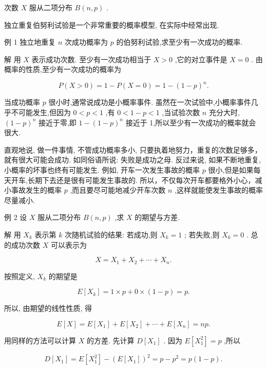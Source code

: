 \documentclass[10pt]{article}
\begin{document}
次数 \(X\) 服从二项分布 \(B\left( {n,p}\right)\) .

独立重复伯努利试验是一个非常重要的概率模型, 在实际中经常出现.

例 1 独立地重复 \(n\) 次成功概率为 \(p\) 的伯努利试验,求至少有一次成功的概率.

解 用 \(X\) 表示成功次数. 至少有一次成功相当于 \(X > 0\) ,它的对立事件是 \(X = 0\) . 由概率的性质,至少有一次成功的概率为

\[
P\left( {X > 0}\right)  = 1 - P\left( {X = 0}\right)  = 1 - {\left( 1 - p\right) }^{n}.
\]

当成功概率 \(p\) 很小时,通常说成功是小概率事件. 虽然在一次试验中,小概率事件几乎不可能发生,但因为 \(0 < p < 1\) ,有 \(0 < 1 - p < 1\) ,当试验次数 \(n\) 充分大时, \({\left( 1 - p\right) }^{n}\) 接近于零,即 \(1 - {\left( 1 - p\right) }^{n}\) 接近于 1,所以至少有一次成功的概率就会很大.

直观地说, 做一件事情, 不管成功概率多小, 只要执着地努力，重复的次数足够多，就有很大可能会成功. 如同俗语所说: 失败是成功之母. 反过来说, 如果不断地重复, 小概率的坏事也终有可能发生. 例如, 开车一次发生事故的概率 \(p\) 很小,但是如果每天开车,长期下去还是很有可能发生事故的. 所以，不仅每次开车都要格外小心，减小事故发生的概率 \(p\) ,而且要尽可能地减少开车次数 \(n\) ,这样就能使发生事故的概率尽量减小.

例 2 设 \(X\) 服从二项分布 \(B\left( {n,p}\right)\) ,求 \(X\) 的期望与方差.

解 用 \({X}_{k}\) 表示第 \(k\) 次随机试验的结果: 若成功,则 \({X}_{k} = 1\) ; 若失败,则 \({X}_{k} = 0\) . 总的成功次数 \(X\) 可以表示为

\[
X = {X}_{1} + {X}_{2} + \cdots  + {X}_{n}.
\]

按照定义, \({X}_{k}\) 的期望是

\[
E\left\lbrack  {X}_{k}\right\rbrack   = 1 \times  p + 0 \times  \left( {1 - p}\right)  = p.
\]

所以, 由期望的线性性质, 得

\[
E\left\lbrack  X\right\rbrack   = E\left\lbrack  {X}_{1}\right\rbrack   + E\left\lbrack  {X}_{2}\right\rbrack   + \cdots  + E\left\lbrack  {X}_{n}\right\rbrack   = {np}.
\]

用同样的方法可以计算 \(X\) 的方差. 先计算 \(D\left\lbrack  {X}_{1}\right\rbrack\) . 因为 \(E\left\lbrack  {X}_{1}^{2}\right\rbrack   = p\) ,所以

\[
D\left\lbrack  {X}_{1}\right\rbrack   = E\left\lbrack  {X}_{1}^{2}\right\rbrack   - {\left( E\left\lbrack  {X}_{1}\right\rbrack  \right) }^{2} = p - {p}^{2} = p\left( {1 - p}\right) .
\]
\end{document}
